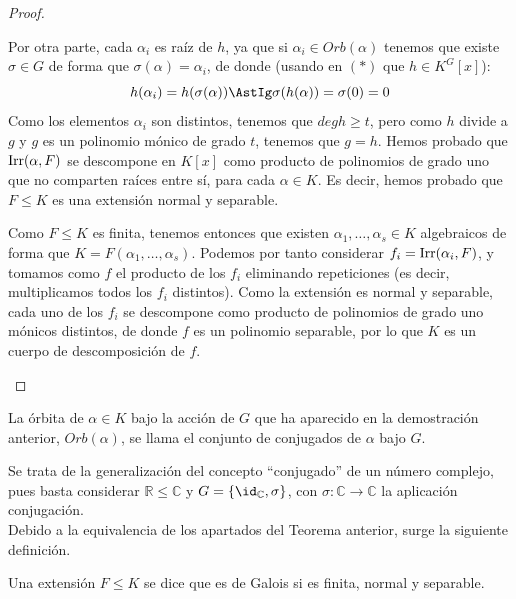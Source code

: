 \begin{teo}
\begin{proof}
\begin{description}
                Por otra parte, cada $\alpha_i$ es raíz de $h$, ya que si $\alpha_i \in Orb(\alpha)$ tenemos que existe $\sigma\in G$ de forma que $\sigma(\alpha)=\alpha_i$, de donde (usando en $(\ast)$ que $h\in K^G[x]$):
                \begin{equation*}
                    h(\alpha_i) = h(\sigma(\alpha)) \AstIg \sigma(h(\alpha)) = \sigma(0) = 0
                \end{equation*}
                Como los elementos $\alpha_i$ son distintos, tenemos que $deg h \geq t$, pero como $h$ divide a $g$ y $g$ es un polinomio mónico de grado $t$, tenemos que $g=h$. Hemos probado que $\operatorname{Irr}(\alpha,F)$ se descompone en $K[x]$ como producto de polinomios de grado uno que no comparten raíces entre sí, para cada $\alpha\in K$. Es decir, hemos probado que $F\leq K$ es una extensión normal y separable.
            \item [$iv)\Longrightarrow i)$] Como $F\leq K$ es finita, tenemos entonces que existen $\alpha_1, \ldots, \alpha_s\in K$ algebraicos de forma que $K = F(\alpha_1, \ldots, \alpha_s)$. Podemos por tanto considerar $f_i = \operatorname{Irr}(\alpha_i, F)$, y tomamos como $f$ el producto de los $f_i$ eliminando repeticiones (es decir, multiplicamos todos los $f_i$ distintos). Como la extensión es normal y separable, cada uno de los $f_i$ se descompone como producto de polinomios de grado uno mónicos distintos, de donde $f$ es un polinomio separable, por lo que $K$ es un cuerpo de descomposición de $f$.\qedhere
        \end{description}
    \end{proof}
\end{teo}

\begin{definicion}
    La órbita de $\alpha\in K$ bajo la acción de $G$ que ha aparecido en la demostración anterior, $Orb(\alpha)$, se llama el conjunto de conjugados de $\alpha$ bajo $G$.
\end{definicion}

Se trata de la generalización del concepto ``conjugado'' de un número complejo, pues basta considerar $\mathbb{R}\leq \mathbb{C}$ y $G=\{\id_{\mathbb{C}}, \sigma\}$, con $\sigma:\mathbb{C}\to\mathbb{C}$ la aplicación conjugación.\\

Debido a la equivalencia de los apartados del Teorema anterior, surge la siguiente definición.
\begin{definicion}
    Una extensión $F\leq K$ se dice que es de Galois si es finita, normal y separable.
\end{definicion}

